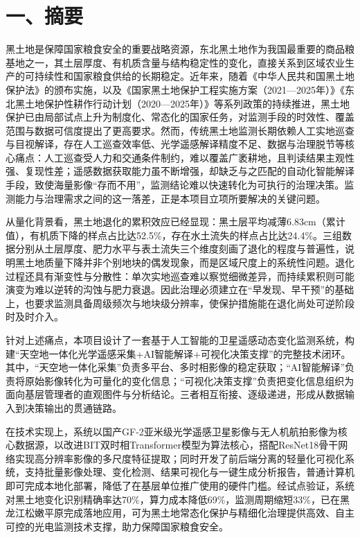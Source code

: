 \section{一、摘要}

黑土地是保障国家粮食安全的重要战略资源，东北黑土地作为我国最重要的商品粮基地之一，其土层厚度、有机质含量与结构稳定性的变化，直接关系到区域农业生产的可持续性和国家粮食供给的长期稳定。近年来，随着《中华人民共和国黑土地保护法》的颁布实施，以及《国家黑土地保护工程实施方案（2021—2025年）》《东北黑土地保护性耕作行动计划（2020—2025年）》等系列政策的持续推进，黑土地保护已由局部试点上升为制度化、常态化的国家任务，对监测手段的时效性、覆盖范围与数据可信度提出了更高要求。然而，传统黑土地监测长期依赖人工实地巡查与目视解译，存在人工巡查效率低、光学遥感解译精度不足、数据与治理脱节等核心痛点：人工巡查受人力和交通条件制约，难以覆盖广袤耕地，且判读结果主观性强、复现性差；遥感数据获取能力虽不断增强，却缺乏与之匹配的自动化智能解译手段，致使海量影像“存而不用”，监测结论难以快速转化为可执行的治理决策。监测能力与治理需求之间的这一落差，正是本项目立项所要解决的关键问题。

从量化背景看，黑土地退化的累积效应已经显现：黑土层平均减薄6.83cm（累计值），有机质下降的样点占比达52.5\%，存在水土流失的样点占比达24.4\%。三组数据分别从土层厚度、肥力水平与表土流失三个维度刻画了退化的程度与普遍性，说明黑土地质量下降并非个别地块的偶发现象，而是区域尺度上的系统性问题。退化过程还具有渐变性与分散性：单次实地巡查难以察觉细微差异，而持续累积则可能演变为难以逆转的沟蚀与肥力衰退。因此治理必须建立在“早发现、早干预”的基础上，也要求监测具备周级频次与地块级分辨率，使保护措施能在退化尚处可逆阶段时及时介入。

针对上述痛点，本项目设计了一套基于人工智能的卫星遥感动态变化监测系统，构建“天空地一体化光学遥感采集+AI智能解译+可视化决策支撑”的完整技术闭环。其中，“天空地一体化采集”负责多平台、多时相影像的稳定获取；“AI智能解译”负责将原始影像转化为可量化的变化信息；“可视化决策支撑”负责把变化信息组织为面向基层管理者的直观图件与分析结论。三者相互衔接、逐级递进，形成从数据输入到决策输出的贯通链路。

在技术实现上，系统以国产GF-2亚米级光学遥感卫星影像与无人机航拍影像为核心数据源，以改进BIT双时相Transformer模型为算法核心，搭配ResNet18骨干网络实现高分辨率影像的多尺度特征提取；同时开发了前后端分离的轻量化可视化系统，支持批量影像处理、变化检测、结果可视化与一键生成分析报告，普通计算机即可完成本地化部署，降低了在基层单位推广使用的硬件门槛。经试点验证，系统对黑土地变化识别精确率达70\%，算力成本降低69\%，监测周期缩短33\%，已在黑龙江松嫩平原完成落地应用，可为黑土地常态化保护与精细化治理提供高效、自主可控的光电监测技术支撑，助力保障国家粮食安全。


